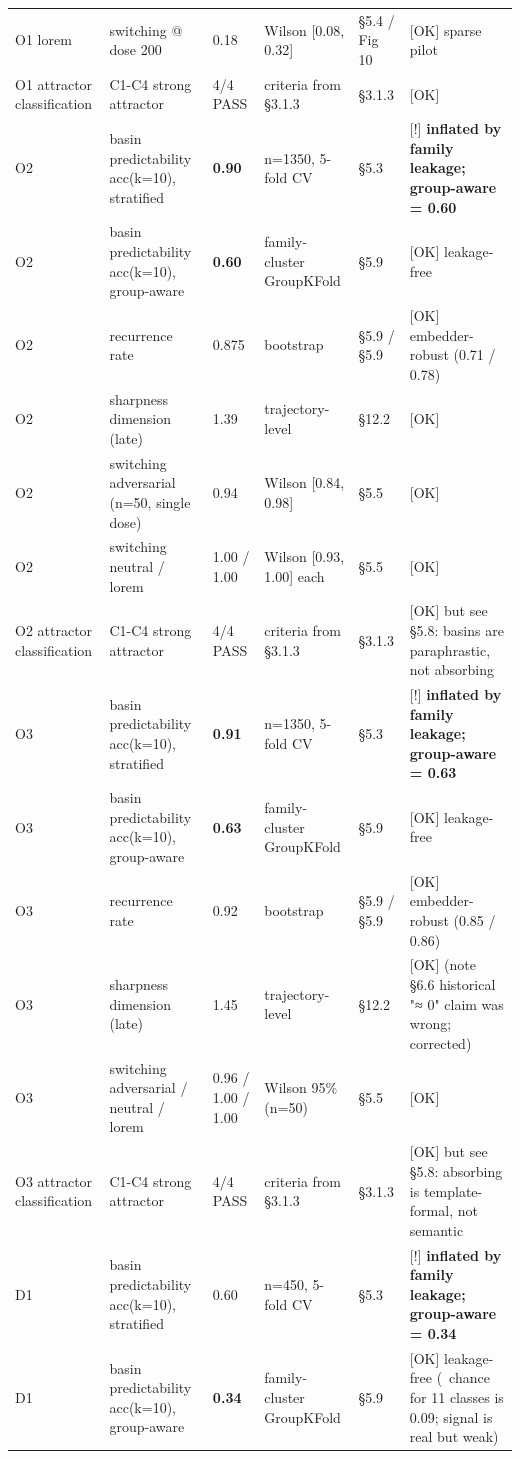 \documentclass{article}
\theoremstyle{plain}
\theoremstyle{definition}
\begin{document}
\begin{table}[h!]
\begin{tabularx}{\textwidth}{lYYYYY}
O1 lorem & switching @ dose 200 & 0.18 & Wilson [0.08, 0.32] & §5.4 / Fig 10 & [OK] sparse pilot \\
O1 attractor classification & C1-C4 strong attractor & 4/4 PASS & criteria from §3.1.3 & §3.1.3 & [OK] \\
O2 & basin predictability acc(k=10), stratified & \textbf{0.90} & n=1350, 5-fold CV & §5.3 & [!] \textbf{inflated by family leakage; group-aware = 0.60} \\
O2 & basin predictability acc(k=10), group-aware & \textbf{0.60} & family-cluster GroupKFold & §5.9 & [OK] leakage-free \\
O2 & recurrence rate & 0.875 & bootstrap & §5.9 / §5.9 & [OK] embedder-robust (0.71 / 0.78) \\
O2 & sharpness dimension (late) & 1.39 & trajectory-level & §12.2 & [OK] \\
O2 & switching adversarial (n=50, single dose) & 0.94 & Wilson [0.84, 0.98] & §5.5 & [OK] \\
O2 & switching neutral / lorem & 1.00 / 1.00 & Wilson [0.93, 1.00] each & §5.5 & [OK] \\
O2 attractor classification & C1-C4 strong attractor & 4/4 PASS & criteria from §3.1.3 & §3.1.3 & [OK] but see §5.8: basins are paraphrastic, not absorbing \\
O3 & basin predictability acc(k=10), stratified & \textbf{0.91} & n=1350, 5-fold CV & §5.3 & [!] \textbf{inflated by family leakage; group-aware = 0.63} \\
O3 & basin predictability acc(k=10), group-aware & \textbf{0.63} & family-cluster GroupKFold & §5.9 & [OK] leakage-free \\
O3 & recurrence rate & 0.92 & bootstrap & §5.9 / §5.9 & [OK] embedder-robust (0.85 / 0.86) \\
O3 & sharpness dimension (late) & 1.45 & trajectory-level & §12.2 & [OK] (note §6.6 historical "≈ 0" claim was wrong; corrected) \\
O3 & switching adversarial / neutral / lorem & 0.96 / 1.00 / 1.00 & Wilson 95\% (n=50) & §5.5 & [OK] \\
O3 attractor classification & C1-C4 strong attractor & 4/4 PASS & criteria from §3.1.3 & §3.1.3 & [OK] but see §5.8: absorbing is template-formal, not semantic \\
D1 & basin predictability acc(k=10), stratified & 0.60 & n=450, 5-fold CV & §5.3 & [!] \textbf{inflated by family leakage; group-aware = 0.34} \\
D1 & basin predictability acc(k=10), group-aware & \textbf{0.34} & family-cluster GroupKFold & §5.9 & [OK] leakage-free (~chance for 11 classes is 0.09; signal is real but weak) \\

\end{tabularx}
\end{table}
\end{document}

